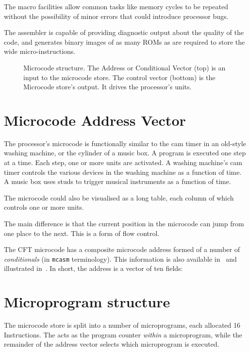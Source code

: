 The macro facilities allow common tasks like memory cycles to be repeated
without the possibility of minor errors that could introduce processor bugs.

The assembler is capable of providing diagnostic output about the quality of
the code, and generates binary images of as many ROMs as are required to store
the wide micro-instructions.


\begin{figure}
  \centering

  \caption[Microcode structure]{\label{fig:microcode-store2}Microcode
    structure. The Address or Conditional Vector (top) is an input to
    the microcode store. The control vector (bottom) is the Microcode
    store's output. It drives the processor's units. }
\end{figure}


\section{Microcode Address Vector}

The processor's microcode is functionally similar to the cam timer in an
old-style washing machine, or the cylinder of a music box. A program is
executed one step at a time. Each step, one or more units are activated. A
washing machine's cam timer controls the various devices in the washing machine
as a function of time. A music box uses studs to trigger musical instruments as
a function of time.

The microcode could also be visualised as a long table, each column of which
controls one or more units.

The main difference is that the current position in the microcode can jump from
one place to the next. This is a form of flow control.

The CFT microcode has a composite microcode address formed of a number of {\em
  conditionals\/} (in \texttt{mcasm} terminology). This information is also
available in~ and illustrated
in~. In short, the address is a vector of ten fields:



\section{Microprogram structure}

The microcode store is split into a number of microprograms, each allocated 16
Instructions. The \UPC{} acts as the program counter {\em within\/} a
microprogram, while the remainder of the address vector selects which
microprogram is executed.

